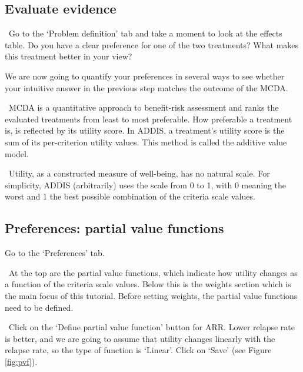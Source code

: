 \documentclass[00_mcda_tutorial.tex]{subfiles}
\begin{document}
\subsection*{Evaluate evidence}
\leftpointright \, Go to the ‘Problem definition’ tab and take a moment to look at the effects table. Do you have a clear preference for one of the two treatments? What makes this treatment better in your view?
\newline

\noindent We are now going to quantify your preferences in several ways to see whether your intuitive answer in the previous step matches the outcome of the MCDA.
\newline

\noindent \faGraduationCap \, MCDA is a quantitative approach to benefit-risk assessment and ranks the evaluated treatments from least to most preferable. How preferable a treatment is, is reflected by its utility score. In ADDIS, a treatment’s utility score is the sum of its per-criterion utility values. This method is called the additive value model.
\newline

\noindent \faGraduationCap \, Utility, as a constructed measure of well-being, has no natural scale. For simplicity, ADDIS (arbitrarily) uses the scale from 0 to 1, with 0 meaning the worst and 1 the best possible combination of the criteria scale values.

\subsection*{Preferences: partial value functions}
\leftpointright Go to the ‘Preferences’ tab.
\newline

\noindent \faGraduationCap \, At the top are the partial value functions, which indicate how utility changes as a function of the criteria scale values. Below this is the weights section which is the main focus of this tutorial. Before setting weights, the partial value functions need to be defined.
\newline

\noindent \leftpointright \, Click on the ‘Define partial value function’ button for ARR. Lower relapse rate is better, and we are going to assume that utility changes linearly with the relapse rate, so the type of function is ‘Linear’. Click on ‘Save’ (see Figure \ref{fig:pvf}).
\end{document}
